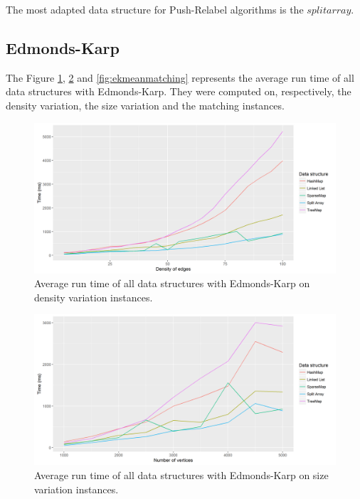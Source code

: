 The most adapted data structure for Push-Relabel algorithms is the $split array$.

\subsection{Edmonds-Karp}
The Figure \ref{fig:ekmeandensity}, \ref{fig:ekmeansize} and \ref{fig:ekmeanmatching} represents the average run time of all data structures with Edmonds-Karp. They were computed on, respectively, the density variation, the size variation and the matching instances.
\begin{figure}[H]
\begin{center}
\includegraphics[scale=0.5]{images/results/ekmeandensity.png}
\caption{Average run time of all data structures with Edmonds-Karp on density variation instances.}
\label{fig:ekmeandensity}
\end{center}
\end{figure}
\begin{figure}[H]
\begin{center}
\includegraphics[scale=0.5]{images/results/ekmeansize.png}
\caption{Average run time of all data structures with Edmonds-Karp on size variation instances.}
\label{fig:ekmeansize}
\end{center}
\end{figure}
